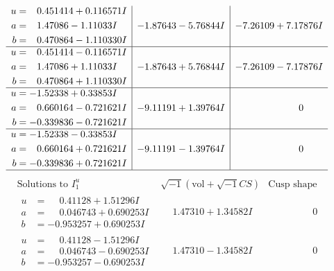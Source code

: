 \documentclass[1p]{elsarticle_modified}
\theoremstyle{definition}
\newcommand{\I}{\sqrt{-1}}
\begin{document}
$$\begin{array}{c|c|c}
\begin{aligned}
u &= \phantom{-}0.451414 + 0.116571 I \\
a &= \phantom{-}1.47086 - 1.11033 I \\
b &= \phantom{-}0.470864 - 1.110330 I\end{aligned}
 & -1.87643 - 5.76844 I & -7.26109 + 7.17876 I \\ \hline\begin{aligned}
u &= \phantom{-}0.451414 - 0.116571 I \\
a &= \phantom{-}1.47086 + 1.11033 I \\
b &= \phantom{-}0.470864 + 1.110330 I\end{aligned}
 & -1.87643 + 5.76844 I & -7.26109 - 7.17876 I \\ \hline\begin{aligned}
u &= -1.52338 + 0.33853 I \\
a &= \phantom{-}0.660164 - 0.721621 I \\
b &= -0.339836 - 0.721621 I\end{aligned}
 & -9.11191 + 1.39764 I & \phantom{-0.000000 } 0 \\ \hline\begin{aligned}
u &= -1.52338 - 0.33853 I \\
a &= \phantom{-}0.660164 + 0.721621 I \\
b &= -0.339836 + 0.721621 I\end{aligned}
 & -9.11191 - 1.39764 I & \phantom{-0.000000 } 0\\
 \hline 
 \end{array}$$\newpage$$\begin{array}{c|c|c}  
\text{Solutions to }I^u_{1}& \I (\text{vol} + \sqrt{-1}CS) & \text{Cusp shape}\\
 \hline 
\begin{aligned}
u &= \phantom{-}0.41128 + 1.51296 I \\
a &= \phantom{-}0.046743 + 0.690253 I \\
b &= -0.953257 + 0.690253 I\end{aligned}
 & \phantom{-}1.47310 + 1.34582 I & \phantom{-0.000000 } 0 \\ \hline\begin{aligned}
u &= \phantom{-}0.41128 - 1.51296 I \\
a &= \phantom{-}0.046743 - 0.690253 I \\
b &= -0.953257 - 0.690253 I\end{aligned}
 & \phantom{-}1.47310 - 1.34582 I & \phantom{-0.000000 } 0 \\ \hline\begin{aligned}

\end{aligned}
\end{array}$$
\end{document}
